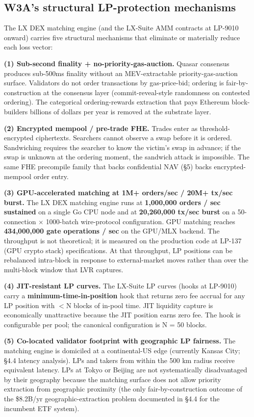 \subsection{W3A's structural LP-protection mechanisms}

The LX DEX matching engine (and the LX-Suite AMM contracts at
LP-9010 onward) carries five structural mechanisms that eliminate or
materially reduce each loss vector:

\textbf{(1) Sub-second finality + no-priority-gas-auction.} Quasar
consensus produces sub-500ms finality without an MEV-extractable
priority-gas-auction surface. Validators do not order transactions by
gas-price-bid; ordering is fair-by-construction at the consensus layer
(commit-reveal-style randomness on contested ordering). The categorical
ordering-rewards extraction that pays Ethereum block-builders billions
of dollars per year is removed at the substrate layer.

\textbf{(2) Encrypted mempool / pre-trade FHE.} Trades enter as
threshold-encrypted ciphertexts. Searchers cannot observe a swap
before it is ordered. Sandwiching requires the searcher to know the
victim's swap in advance; if the swap is unknown at the ordering
moment, the sandwich attack is impossible. The same FHE precompile
family that backs confidential NAV (\S 5) backs encrypted-mempool
order entry.

\textbf{(3) GPU-accelerated matching at 1M+ orders/sec / 20M+ tx/sec
burst.} The LX DEX matching engine runs at \textbf{1,000,000 orders /
sec sustained} on a single Go CPU node and at \textbf{20,260,000
tx/sec burst} on a 50-connection $\times$ 1000-batch wire-protocol
configuration. GPU matching reaches \textbf{434,000,000 gate operations
/ sec} on the GPU/MLX backend. The throughput is not theoretical; it is
measured on the production code at LP-137 (GPU crypto stack)
specifications. At that throughput, LP positions can be rebalanced
intra-block in response to external-market moves rather than over the
multi-block window that LVR captures.

\textbf{(4) JIT-resistant LP curves.} The LX-Suite LP curves (hooks
at LP-9010) carry a \textbf{minimum-time-in-position} hook that returns
zero fee accrual for any LP position with $<$N blocks of in-pool time.
JIT liquidity capture is economically unattractive because the JIT
position earns zero fee. The hook is configurable per pool; the canonical
configuration is N = 50 blocks.

\textbf{(5) Co-located validator footprint with geographic LP
fairness.} The matching engine is domiciled at a continental-US edge
(currently Kansas City; \S 4.4 latency analysis). LPs and takers from
within the 500 km radius receive equivalent latency. LPs at Tokyo or
Beijing are not systematically disadvantaged by their geography
because the matching surface does not allow priority extraction from
geographic proximity (the only fair-by-construction outcome of the
\$8.2B/yr geographic-extraction problem documented in \S 4.4 for the
incumbent ETF system).

